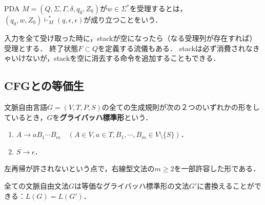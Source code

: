 \begin{definition}[受理条件]
    PDA $M=(Q,\Sigma,\Gamma,\delta,q_0,Z_0)$が$w\in\Sigma^*$を受理するとは，$(q_0,w,Z_0)\vdash^*_M(q,\epsilon,\epsilon)$が成り立つことをいう．
\end{definition}
\begin{remarks}
    入力を全て受け取った時に，stackが空になったら（なる受理列が存在すれば）受理とする．
    終了状態$F\subset Q$を定義する流儀もある．
    stackは必ず消費されなきゃいけないが，stackを空に消去する命令を追加することもできる．
\end{remarks}

\subsection{CFGとの等価生}

\begin{definition}
    文脈自由言語$G=(V,T,P,S)$の全ての生成規則が次の２つのいずれかの形をしているとき，$G$を\textbf{グライバッハ標準形}という．
    \begin{enumerate}
        \item $A\to aB_1\cdots B_m\quad(A\in V,a\in T,B_1,\cdots,B_m\in V\setminus\{S\})$．
        \item $S\to\epsilon$．
    \end{enumerate}
    左再帰が許されないという点で，右線型文法の$m\ge 2$を一部許容した形である．
\end{definition}

\begin{theorem}[Greibach]\label{thm-Greibach-normal-form}
    全ての文脈自由文法$G$は等価なグライバッハ標準形の文法$G'$に書換えることができる：$L(G)=L(G')$．
\end{theorem}


